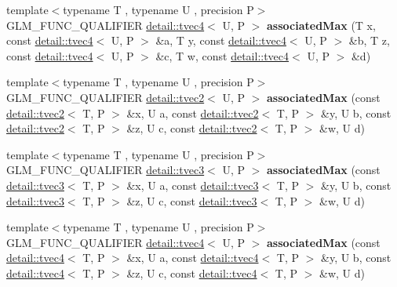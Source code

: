 \begin{DoxyCompactItemize}
\item 
{\footnotesize template$<$typename T , typename U , precision P$>$ }\\G\+L\+M\+\_\+\+F\+U\+N\+C\+\_\+\+Q\+U\+A\+L\+I\+F\+I\+ER \hyperlink{structglm_1_1detail_1_1tvec4}{detail\+::tvec4}$<$ U, P $>$ {\bfseries associated\+Max} (T x, const \hyperlink{structglm_1_1detail_1_1tvec4}{detail\+::tvec4}$<$ U, P $>$ \&a, T y, const \hyperlink{structglm_1_1detail_1_1tvec4}{detail\+::tvec4}$<$ U, P $>$ \&b, T z, const \hyperlink{structglm_1_1detail_1_1tvec4}{detail\+::tvec4}$<$ U, P $>$ \&c, T w, const \hyperlink{structglm_1_1detail_1_1tvec4}{detail\+::tvec4}$<$ U, P $>$ \&d)\hypertarget{namespaceglm_ac1775bef23dce24ccc58b4d28ebedfe5}{}\label{namespaceglm_ac1775bef23dce24ccc58b4d28ebedfe5}

\item 
{\footnotesize template$<$typename T , typename U , precision P$>$ }\\G\+L\+M\+\_\+\+F\+U\+N\+C\+\_\+\+Q\+U\+A\+L\+I\+F\+I\+ER \hyperlink{structglm_1_1detail_1_1tvec2}{detail\+::tvec2}$<$ U, P $>$ {\bfseries associated\+Max} (const \hyperlink{structglm_1_1detail_1_1tvec2}{detail\+::tvec2}$<$ T, P $>$ \&x, U a, const \hyperlink{structglm_1_1detail_1_1tvec2}{detail\+::tvec2}$<$ T, P $>$ \&y, U b, const \hyperlink{structglm_1_1detail_1_1tvec2}{detail\+::tvec2}$<$ T, P $>$ \&z, U c, const \hyperlink{structglm_1_1detail_1_1tvec2}{detail\+::tvec2}$<$ T, P $>$ \&w, U d)\hypertarget{namespaceglm_ac62eaf5209fc441ade50b87df43829c0}{}\label{namespaceglm_ac62eaf5209fc441ade50b87df43829c0}

\item 
{\footnotesize template$<$typename T , typename U , precision P$>$ }\\G\+L\+M\+\_\+\+F\+U\+N\+C\+\_\+\+Q\+U\+A\+L\+I\+F\+I\+ER \hyperlink{structglm_1_1detail_1_1tvec3}{detail\+::tvec3}$<$ U, P $>$ {\bfseries associated\+Max} (const \hyperlink{structglm_1_1detail_1_1tvec3}{detail\+::tvec3}$<$ T, P $>$ \&x, U a, const \hyperlink{structglm_1_1detail_1_1tvec3}{detail\+::tvec3}$<$ T, P $>$ \&y, U b, const \hyperlink{structglm_1_1detail_1_1tvec3}{detail\+::tvec3}$<$ T, P $>$ \&z, U c, const \hyperlink{structglm_1_1detail_1_1tvec3}{detail\+::tvec3}$<$ T, P $>$ \&w, U d)\hypertarget{namespaceglm_a42c7107a2243cd0a7eefb95a69c0c5c0}{}\label{namespaceglm_a42c7107a2243cd0a7eefb95a69c0c5c0}

\item 
{\footnotesize template$<$typename T , typename U , precision P$>$ }\\G\+L\+M\+\_\+\+F\+U\+N\+C\+\_\+\+Q\+U\+A\+L\+I\+F\+I\+ER \hyperlink{structglm_1_1detail_1_1tvec4}{detail\+::tvec4}$<$ U, P $>$ {\bfseries associated\+Max} (const \hyperlink{structglm_1_1detail_1_1tvec4}{detail\+::tvec4}$<$ T, P $>$ \&x, U a, const \hyperlink{structglm_1_1detail_1_1tvec4}{detail\+::tvec4}$<$ T, P $>$ \&y, U b, const \hyperlink{structglm_1_1detail_1_1tvec4}{detail\+::tvec4}$<$ T, P $>$ \&z, U c, const \hyperlink{structglm_1_1detail_1_1tvec4}{detail\+::tvec4}$<$ T, P $>$ \&w, U d)\hypertarget{namespaceglm_ae638f016094457c09c9166d1f03f5a5f}{}\label{namespaceglm_ae638f016094457c09c9166d1f03f5a5f}


\end{DoxyCompactItemize}
